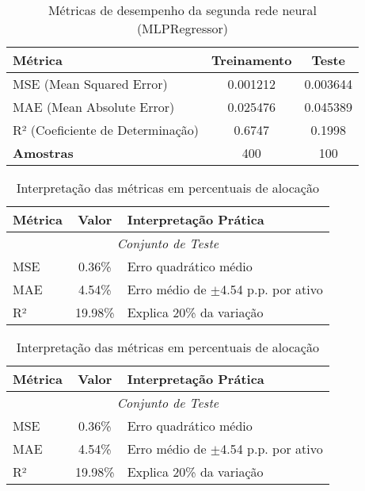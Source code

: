 
\begin{table}[h!]
\centering
\caption{Métricas de desempenho da segunda rede neural (MLPRegressor)}
\label{tab:metricas_segunda_rede}
\begin{tabular}{lcc}
\toprule
\textbf{Métrica} & \textbf{Treinamento} & \textbf{Teste} \\
\midrule
MSE (Mean Squared Error) & 0.001212 & 0.003644 \\
MAE (Mean Absolute Error) & 0.025476 & 0.045389 \\
R² (Coeficiente de Determinação) & 0.6747 & 0.1998 \\
\midrule
\textbf{Amostras} & 400 & 100 \\
\bottomrule
\end{tabular}
\end{table}

\begin{table}[h!]
\centering
\caption{Interpretação das métricas em percentuais de alocação}
\label{tab:interpretacao_percentuais}
\begin{tabular}{lcl}
\toprule
\textbf{Métrica} & \textbf{Valor} & \textbf{Interpretação Prática} \\
\midrule
\multicolumn{3}{c}{\textit{Conjunto de Teste}} \\
\midrule
MSE & 0.36\% & Erro quadrático médio \\
MAE & 4.54\% & Erro médio de $\pm$4.54 p.p. por ativo \\
R² & 19.98\% & Explica 20\% da variação \\
\bottomrule
\end{tabular}
\end{table}
\begin{table}[h!]
\centering
\caption{Interpretação das métricas em percentuais de alocação}
\label{tab:interpretacao_percentuais}
\begin{tabular}{lcl}
\toprule
\textbf{Métrica} & \textbf{Valor} & \textbf{Interpretação Prática} \\
\midrule
\multicolumn{3}{c}{\textit{Conjunto de Teste}} \\
\midrule
MSE & 0.36\% & Erro quadrático médio \\
MAE & 4.54\% & Erro médio de $\pm$4.54 p.p. por ativo \\
R² & 19.98\% & Explica 20\% da variação \\
\bottomrule
\end{tabular}
\end{table}

